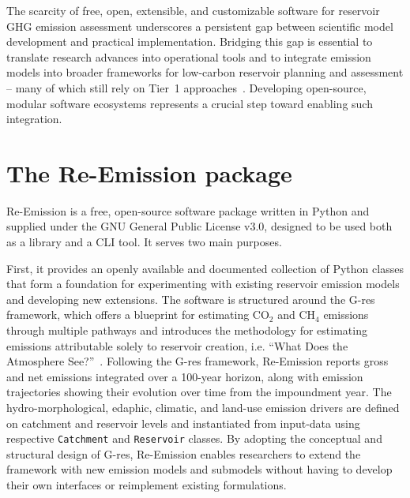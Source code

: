 \documentclass[review, authoryear, 1p]{elsarticle} %
\begin{document}
The scarcity of free, open, extensible, and customizable software for reservoir \ac{GHG} emission assessment underscores a persistent gap between scientific model development and practical implementation.
Bridging this gap is essential to translate research advances into operational tools and to integrate emission models into broader frameworks for low-carbon reservoir planning and assessment -- many of which still rely on Tier~1 approaches~\citep{Almeida2019, Carlino2024, Tangi2024}.
Developing open-source, modular software ecosystems represents a crucial step toward enabling such integration.

\section{The Re-Emission package}
\label{sec:reemission}

Re-Emission is a free, open-source software package written in Python and supplied under the GNU General Public License v3.0, designed to be used both as a library and a \acf{CLI} tool. It serves two main purposes.

First, it provides an openly available and documented collection of Python classes that form a foundation for experimenting with existing reservoir emission models and developing new extensions.
The software is structured around the G-res framework, which offers a blueprint for estimating CO$_2$ and CH$_4$ emissions through multiple pathways and introduces the methodology for estimating emissions attributable solely to reservoir creation, i.e. ``What Does the Atmosphere See?''~\citep{Prairie2018}.
Following the G-res framework, Re-Emission reports gross and net emissions integrated over a 100-year horizon, along with emission trajectories showing their evolution over time from the impoundment year.
The hydro-morphological, edaphic, climatic, and land-use emission drivers are defined on catchment and reservoir levels and instantiated from input-data using respective \texttt{Catchment} and \texttt{Reservoir} classes.
By adopting the conceptual and structural design of G-res, Re-Emission enables researchers to extend the framework with new emission models and submodels without having to develop their own interfaces or reimplement existing formulations.
\end{document}
